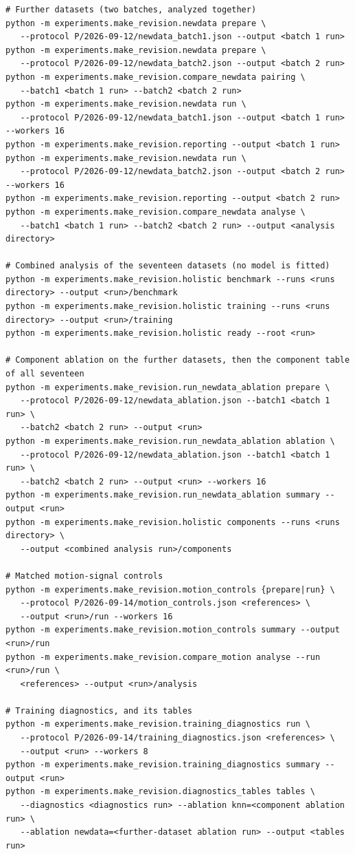 \begin{scriptsize}
\begin{verbatim}
# Further datasets (two batches, analyzed together)
python -m experiments.make_revision.newdata prepare \
   --protocol P/2026-09-12/newdata_batch1.json --output <batch 1 run>
python -m experiments.make_revision.newdata prepare \
   --protocol P/2026-09-12/newdata_batch2.json --output <batch 2 run>
python -m experiments.make_revision.compare_newdata pairing \
   --batch1 <batch 1 run> --batch2 <batch 2 run>
python -m experiments.make_revision.newdata run \
   --protocol P/2026-09-12/newdata_batch1.json --output <batch 1 run> --workers 16
python -m experiments.make_revision.reporting --output <batch 1 run>
python -m experiments.make_revision.newdata run \
   --protocol P/2026-09-12/newdata_batch2.json --output <batch 2 run> --workers 16
python -m experiments.make_revision.reporting --output <batch 2 run>
python -m experiments.make_revision.compare_newdata analyse \
   --batch1 <batch 1 run> --batch2 <batch 2 run> --output <analysis directory>

# Combined analysis of the seventeen datasets (no model is fitted)
python -m experiments.make_revision.holistic benchmark --runs <runs directory> --output <run>/benchmark
python -m experiments.make_revision.holistic training --runs <runs directory> --output <run>/training
python -m experiments.make_revision.holistic ready --root <run>

# Component ablation on the further datasets, then the component table of all seventeen
python -m experiments.make_revision.run_newdata_ablation prepare \
   --protocol P/2026-09-12/newdata_ablation.json --batch1 <batch 1 run> \
   --batch2 <batch 2 run> --output <run>
python -m experiments.make_revision.run_newdata_ablation ablation \
   --protocol P/2026-09-12/newdata_ablation.json --batch1 <batch 1 run> \
   --batch2 <batch 2 run> --output <run> --workers 16
python -m experiments.make_revision.run_newdata_ablation summary --output <run>
python -m experiments.make_revision.holistic components --runs <runs directory> \
   --output <combined analysis run>/components

# Matched motion-signal controls
python -m experiments.make_revision.motion_controls {prepare|run} \
   --protocol P/2026-09-14/motion_controls.json <references> \
   --output <run>/run --workers 16
python -m experiments.make_revision.motion_controls summary --output <run>/run
python -m experiments.make_revision.compare_motion analyse --run <run>/run \
   <references> --output <run>/analysis

# Training diagnostics, and its tables
python -m experiments.make_revision.training_diagnostics run \
   --protocol P/2026-09-14/training_diagnostics.json <references> \
   --output <run> --workers 8
python -m experiments.make_revision.training_diagnostics summary --output <run>
python -m experiments.make_revision.diagnostics_tables tables \
   --diagnostics <diagnostics run> --ablation knn=<component ablation run> \
   --ablation newdata=<further-dataset ablation run> --output <tables run>


\end{verbatim}
\end{scriptsize}

